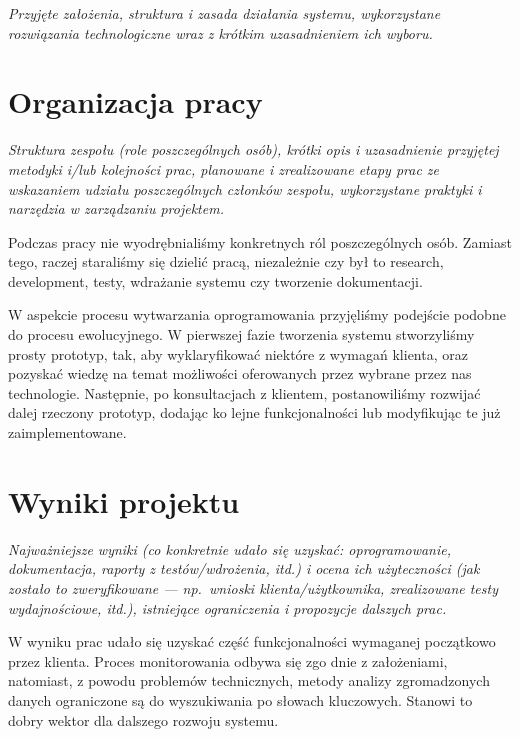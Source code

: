 \documentclass[polish,12pt]{aghthesis}
\begin{document}
\emph{Przyjęte założenia, struktura i zasada działania systemu,
  wykorzystane rozwiązania technologiczne wraz z krótkim uzasadnieniem
  ich wyboru.}

\section{Organizacja pracy}
\label{sec:organizacja-pracy}

\emph{Struktura zespołu (role poszczególnych osób), krótki opis i
  uzasadnienie przyjętej metodyki i/lub kolejności prac, planowane i
  zrealizowane etapy prac ze wskazaniem udziału poszczególnych
  członków zespołu, wykorzystane praktyki i narzędzia w zarządzaniu
  projektem.}

Podczas pracy nie wyodrębnialiśmy konkretnych ról poszczególnych osób. Zamiast tego, raczej staraliśmy się dzielić pracą, niezależnie czy
był to
research, development, testy, wdrażanie systemu czy tworzenie dokumentacji.

W aspekcie procesu wytwarzania oprogramowania przyjęliśmy podejście podobne do procesu ewolucyjnego. W pierwszej fazie tworzenia systemu 
stworzyliśmy prosty prototyp, tak, aby wyklaryfikować niektóre z wymagań klienta, oraz pozyskać wiedzę na temat możliwości oferowanych
przez wybrane przez nas technologie. Następnie, po konsultacjach z klientem, postanowiliśmy rozwijać dalej rzeczony prototyp, dodając ko
lejne funkcjonalności lub modyfikując te już zaimplementowane. 

\section{Wyniki projektu}

\label{sec:wyniki-projektu}

\emph{Najważniejsze wyniki (co konkretnie udało się uzyskać:
  oprogramowanie, dokumentacja, raporty z testów/wdrożenia, itd.)
  i ocena ich użyteczności (jak zostało to zweryfikowane --- np.\ wnioski
  klienta/użytkownika, zrealizowane testy wydajnościowe, itd.),
  istniejące ograniczenia i propozycje dalszych prac.}

W wyniku prac udało się uzyskać część funkcjonalności
wymaganej początkowo przez klienta. Proces monitorowania odbywa się zgo
dnie z założeniami, natomiast, z powodu problemów technicznych, metody analizy
zgromadzonych danych ograniczone są do wyszukiwania po słowach kluczowych. Stanowi
to dobry wektor dla dalszego rozwoju systemu.
\end{document}
